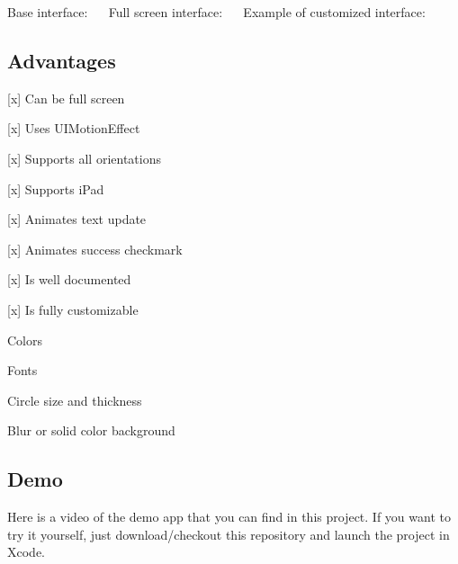 Base interface\+:~\newline
 \href{Images/screenshot_002.jpg}{\tt } \href{Images/screenshot_003.jpg}{\tt } \href{Images/screenshot_004.jpg}{\tt } \href{Images/screenshot_005.jpg}{\tt } ~\newline
 Full screen interface\+:~\newline
 \href{Images/screenshot_007.jpg}{\tt } \href{Images/screenshot_008.jpg}{\tt } \href{Images/screenshot_009.jpg}{\tt } \href{Images/screenshot_010.jpg}{\tt } ~\newline
 Example of customized interface\+:~\newline
 \href{Images/screenshot_013.jpg}{\tt } \href{Images/screenshot_006.jpg}{\tt } \href{Images/screenshot_011.jpg}{\tt } \href{Images/screenshot_012.jpg}{\tt }

\subsection*{Advantages}


\begin{DoxyItemize}
\item \mbox{[}x\mbox{]} Can be full screen
\item \mbox{[}x\mbox{]} Uses {\ttfamily U\+I\+Motion\+Effect}
\item \mbox{[}x\mbox{]} Supports all orientations
\item \mbox{[}x\mbox{]} Supports i\+Pad
\item \mbox{[}x\mbox{]} Animates text update
\item \mbox{[}x\mbox{]} Animates success checkmark
\item \mbox{[}x\mbox{]} Is well documented
\item \mbox{[}x\mbox{]} Is fully customizable
\begin{DoxyItemize}
\item Colors
\item Fonts
\item Circle size and thickness
\item Blur or solid color background
\end{DoxyItemize}
\end{DoxyItemize}

\subsection*{Demo}

Here is a video of the demo app that you can find in this project. If you want to try it yourself, just download/checkout this repository and launch the project in Xcode.

